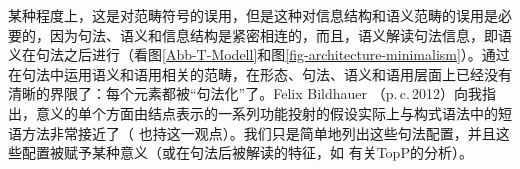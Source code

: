 %
某种程度上，这是对范畴符号的误用，但是这种对信息结构和语义范畴的误用是必要的，因为句法、语义和信息结构是紧密相连的，而且，语义解读句法信息，即语义在句法之后进行（看图\ref{Abb-T-Modell}和图\ref{fig-architecture-minimalism}）。通过在句法中运用语义和语用相关的范畴，在形态、句法、语义和语用层面上已经没有清晰的界限了：每个元素都被“句法化”了。Felix Bildhauer （p.\,c.\,2012）向我指出，意义的单个方面由结点表示的一系列功能投射的假设实际上与构式语法中的短语方法非常接近了（\citealp[]{Adger2013a} 也持这一观点）。我们只是简单地列出这些句法配置，并且这些配置被赋予某种意义（或在句法后被解读的特征，如 有关TopP的分析）。

